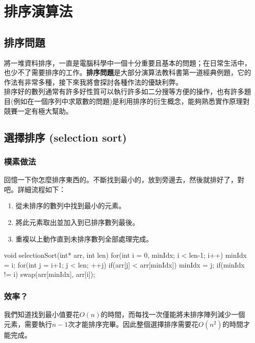 \documentclass[main.tex]{subfiles}
\begin{document}
\chapter{排序演算法}
\section{排序問題}
將一堆資料排序，一直是電腦科學中一個十分重要且基本的問題；在日常生活中，也少不了需要排序的工作。\textbf{排序問題}是大部分演算法教科書第一道經典例題，它的作法有非常多種，接下來我將會探討各種作法的優缺利弊。\\
排序好的數列通常有許多好性質可以執行許多如二分搜等方便的操作，也有許多題目(例如在一個序列中求眾數的問題)是利用排序的衍生概念，能夠熟悉實作原理對競賽一定有極大幫助。

\section{選擇排序 (selection sort)}
\subsection{樸素做法}
回憶一下你怎麼排序東西的。不斷找到最小的，放到旁邊去，然後就排好了，對吧。詳細流程如下：
\begin{enumerate}
\item 從未排序的數列中找到最小的元素。
\item 將此元素取出並加入到已排序數列最後。
\item 重複以上動作直到未排序數列全部處理完成。
\end{enumerate}
\begin{C++}
void selectionSort(int* arr, int len){
    for(int i = 0, minIdx; i < len-1; i++){
        minIdx = i;
        for(int j = i+1; j < len; ++j)
            if(arr[j] < arr[minIdx])
                minIdx = j;
        if(minIdx != i)
            swap(arr[minIdx], arr[i]);
    }
}
\end{C++}
\subsection{效率？}
我們知道找到最小值要花$O(n)$的時間，而每找一次僅能將未排序陣列減少一個元素，需要執行$n-1$次才能排序完畢。因此整個選擇排序需要花$O(n^2)$的時間才能完成。
\end{document}
